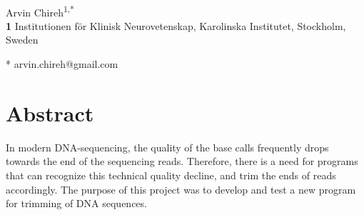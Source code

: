 \documentclass[10pt,letterpaper]{article}
\date{}
\begin{document}
\vspace*{0.2in}

\begin{flushleft}
{\Large
\textbf{} %
}
\newline
\\
Arvin Chireh\textsuperscript{1,*}
\\
\bigskip
\textbf{1} Institutionen för Klinisk Neurovetenskap, Karolinska Institutet, Stockholm, Sweden
\\

\bigskip

% 
%





* arvin.chireh@gmail.com

\end{flushleft}
\section*{Abstract}
In modern DNA-sequencing, the quality of the base calls frequently drops towards the end of the sequencing reads. Therefore, there is a need for programs that can recognize this technical quality decline, and trim the ends of reads accordingly. The purpose of this project was to develop and test a new program for trimming of DNA sequences.
\end{document}
